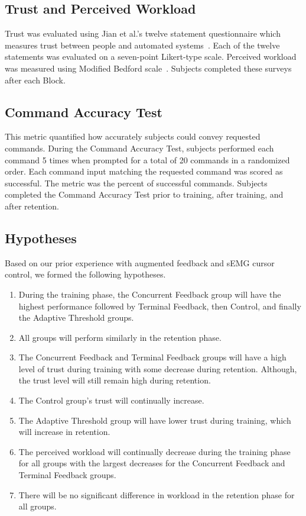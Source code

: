 \subsection{Trust and Perceived Workload}
Trust was evaluated using Jian et al.'s twelve statement questionnaire which measures trust between people and automated systems~\cite{jian_foundations_2000}.
Each of the twelve statements was evaluated on a seven-point Likert-type scale.
Perceived workload was measured using Modified Bedford scale~\cite{roscoe_subjective_1990}.
Subjects completed these surveys after each Block.

\subsection{Command Accuracy Test}
This metric quantified how accurately subjects could convey requested commands.
During the Command Accuracy Test, subjects performed each command 5 times when prompted for a total of 20 commands in a randomized order.
Each command input matching the requested command was scored as successful.
The metric was the percent of successful commands.
Subjects completed the Command Accuracy Test prior to training, after training, and after retention.

\subsection{Hypotheses}
Based on our prior experience with augmented feedback and sEMG cursor control, we formed the following hypotheses.

\begin{enumerate}
	\item During the training phase, the Concurrent Feedback group will have the highest performance followed by Terminal Feedback, then Control, and finally the Adaptive Threshold groups.
	\item All groups will perform similarly in the retention phase.
    \item The Concurrent Feedback and Terminal Feedback groups will have a high level of trust during training with some decrease during retention.
    Although, the trust level will still remain high during retention.
	\item The Control group's trust will continually increase.
	\item The Adaptive Threshold group will have lower trust during training, which will increase in retention.
	\item The perceived workload will continually decrease during the training phase for all groups with the largest decreases for the Concurrent Feedback and Terminal Feedback groups.
    \item There will be no significant difference in workload in the retention phase for all groups.
\end{enumerate}

